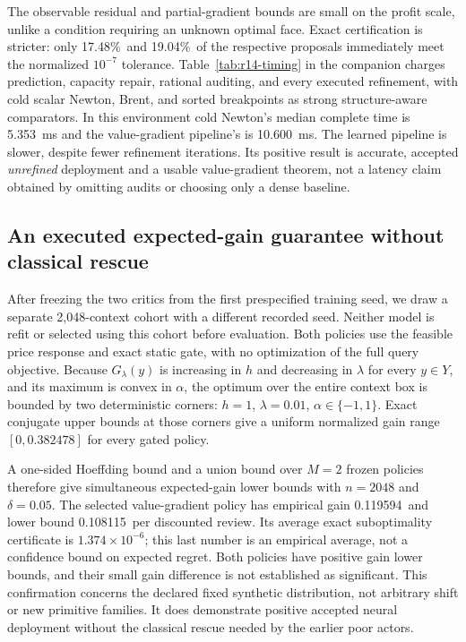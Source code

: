 \documentclass[11pt,letterpaper]{article}
\theoremstyle{definition}
\newcommand{\1}{\mathbf 1}
\newcommand{\RFourteenImmediateValue}{17.48\%}
\newcommand{\RFourteenImmediateGradient}{19.04\%}
\newcommand{\RFourteenColdTime}{5.353}
\newcommand{\RFourteenLearnedTime}{10.600}
\newcommand{\RFourteenRange}{0.382478}
\newcommand{\RFourteenValidationGain}{0.119594}
\newcommand{\RFourteenValidationFloor}{0.108115}
\newcommand{\RFourteenValidationGap}{$1.374\times10^{-6}$}
\begin{document}
The observable residual and partial-gradient bounds are small on the profit scale, unlike a condition requiring an unknown optimal face. Exact certification is stricter: only \RFourteenImmediateValue\ and \RFourteenImmediateGradient\ of the respective proposals immediately meet the normalized $10^{-7}$ tolerance. Table~\ref{tab:r14-timing} in the companion charges prediction, capacity repair, rational auditing, and every executed refinement, with cold scalar Newton, Brent, and sorted breakpoints as strong structure-aware comparators. In this environment cold Newton's median complete time is \RFourteenColdTime\ ms and the value-gradient pipeline's is \RFourteenLearnedTime\ ms. The learned pipeline is slower, despite fewer refinement iterations. Its positive result is accurate, accepted \emph{unrefined} deployment and a usable value-gradient theorem, not a latency claim obtained by omitting audits or choosing only a dense baseline.

\subsection{An executed expected-gain guarantee without classical rescue}
After freezing the two critics from the first prespecified training seed, we draw a separate 2,048-context cohort with a different recorded seed. Neither model is refit or selected using this cohort before evaluation. Both policies use the feasible price response and exact static gate, with no optimization of the full query objective. Because $G_\lambda(y)$ is increasing in $h$ and decreasing in $\lambda$ for every $y\in Y$, and its maximum is convex in $\alpha$, the optimum over the entire context box is bounded by two deterministic corners: $h=1$, $\lambda=0.01$, $\alpha\in\{-1,1\}$. Exact conjugate upper bounds at those corners give a uniform normalized gain range $[0,\RFourteenRange]$ for every gated policy.

A one-sided Hoeffding bound and a union bound over $M=2$ frozen policies therefore give simultaneous expected-gain lower bounds with $n=2048$ and $\delta=0.05$. The selected value-gradient policy has empirical gain \RFourteenValidationGain\ and lower bound \RFourteenValidationFloor\ per discounted review. Its average exact suboptimality certificate is \RFourteenValidationGap; this last number is an empirical average, not a confidence bound on expected regret. Both policies have positive gain lower bounds, and their small gain difference is not established as significant. This confirmation concerns the declared fixed synthetic distribution, not arbitrary shift or new primitive families. It does demonstrate positive accepted neural deployment without the classical rescue needed by the earlier poor actors.
\end{document}
